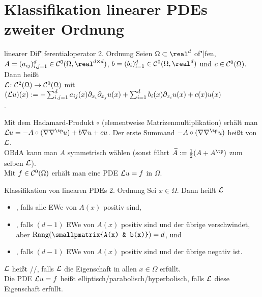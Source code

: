 \pagebreak

\section{%
    Klassifikation linearer PDEs zweiter Ordnung%
}

\begin{Def}{linearer Dif"|ferentialoperator 2. Ordnung}
    Seien $\Omega \subset \real^d$ of"|fen,\\
    $A = (a_{ij})_{i,j=1}^d \in \C^0(\Omega, \real^{d \times d})$,
    $b = (b_i)_{i=1}^d \in \C^0(\Omega, \real^d)$ und $c \in \mathcal{C}^0(\Omega)$.
    Dann heißt\\
    $\mathcal{L}\colon \mathcal{C}^2(\Omega) \to \mathcal{C}^0(\Omega)$ mit
    $(\mathcal{L} u)(x) := -\sum_{i,j=1}^d a_{ij}(x) \partial_{x_i} \partial_{x_j} u(x) +
    \sum_{i=1}^d b_i(x) \partial_{x_i} u(x) + c(x) u(x)$\\
    .
\end{Def}

\begin{Bem}
    Mit dem Hadamard-Produkt $\circ$ (elementweise Matrizenmultiplikation) erhält man
    $\L u = -A \circ (\nabla \nabla^\tp u) + b \nabla u + cu$.
    Der erste Summand
    $-A \circ (\nabla \nabla^\tp u)$ heißt  von $\mathcal{L}$.\\
    OBdA kann man $A$ symmetrisch wählen (sonst führt $\widetilde{A} := \frac{1}{2} (A + A^\tp)$
    zum selben $\mathcal{L}$).\\
    Mit $f \in \mathcal{C}^0(\Omega)$ erhält man eine PDE $\mathcal{L} u = f$ in $\Omega$.
\end{Bem}

\linie

\begin{Def}{Klassifikation von linearen PDEs 2. Ordnung}
    Sei $x \in \Omega$.
    Dann heißt $\mathcal{L}$
    \begin{itemize}
        \item
        ,
        falls alle EWe von $A(x)$ positiv sind,

        \item
        ,
        falls $(d - 1)$ EWe von $A(x)$ positiv sind und der übrige verschwindet,
        aber $\Rang(\smallpmatrix{A(x) & b(x)}) = d$, und

        \item
        ,
        falls $(d - 1)$ EWe von $A(x)$ positiv sind und der übrige negativ ist.
    \end{itemize}
    $\mathcal{L}$ heißt //,
    falls $\mathcal{L}$ die Eigenschaft in allen $x \in \Omega$ erfüllt.\\
    Die PDE $\mathcal{L} u = f$ heißt elliptisch/parabolisch/hyperbolisch,
    falls $\mathcal{L}$ diese Eigenschaft erfüllt.
\end{Def}


